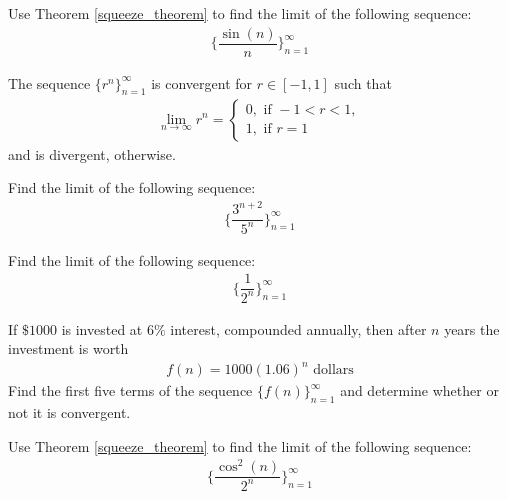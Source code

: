 \begin{exercise}
Use Theorem \ref{squeeze_theorem} to find the limit of the following sequence:
\begin{align*}
    \Big\{\dfrac{\sin(n)}{n}\Big\}_{n=1}^{\infty}
\end{align*}
\end{exercise}

\begin{theorem}
The sequence $\{r^{n}\}_{n=1}^{\infty}$ is convergent for $r \in [-1, 1]$ such that
\begin{align*}
    \lim_{n \longrightarrow \infty} r^{n} = \begin{cases}
    0, \hspace{4pt} \text{if} \hspace{4pt} -1 < r < 1,\\[2ex]
    1, \hspace{4pt} \text{if} \hspace{4pt} r = 1
    \end{cases}
\end{align*}
and is divergent, otherwise.
\end{theorem}

\begin{exercise}
Find the limit of the following sequence:
\begin{align*}
    \Big\{\dfrac{3^{n+2}}{5^{n}}\Big\}_{n=1}^{\infty}
\end{align*}
\end{exercise}

\begin{exercise}
Find the limit of the following sequence:
\begin{align*}
    \Big\{\dfrac{1}{2^{n}}\Big\}_{n=1}^{\infty}
\end{align*}
\end{exercise}

\begin{exercise}
If $\$1000$ is invested at $6\%$ interest, compounded annually, then after $n$ years the investment is worth
\begin{align*}
    f(n) = 1000(1.06)^{n} \hspace{4pt} \text{dollars}
\end{align*}
Find the first five terms of the sequence $\{f(n)\}_{n=1}^{\infty}$ and determine whether or not it is convergent.
\end{exercise}

\begin{exercise}
Use Theorem \ref{squeeze_theorem} to find the limit of the following sequence:
\begin{align*}
    \Big\{\dfrac{\cos^{2}(n)}{2^{n}}\Big\}_{n=1}^{\infty}
\end{align*}
\end{exercise}

